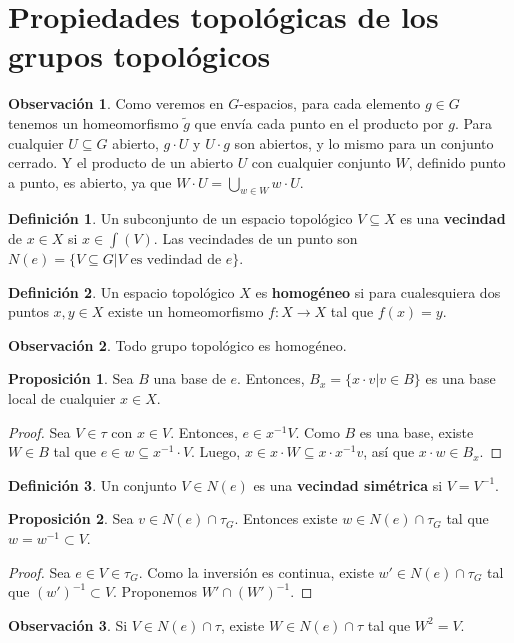 \documentclass[spanish]{article}
\theoremstyle{definition}
\newtheorem*{defn}{Definición}
\newtheorem*{obs}{Observación}
\newtheorem*{prop}{Proposición}
\begin{document}
\section{Propiedades topológicas de los grupos topológicos}
\begin{obs}
	Como veremos en $G$-espacios, para cada elemento $g\in G$ tenemos un homeomorfismo $\tilde{g}$ que envía cada punto en el producto por $g$. Para cualquier $U\subseteq G$ abierto, $g\cdot U$ y $U\cdot g$ son abiertos, y lo mismo para un conjunto cerrado. Y el producto de un abierto $U$ con cualquier conjunto $W$, definido punto a punto, es abierto, ya que $W\cdot U=\bigcup_{w\in W}w\cdot U$.
\end{obs}
\begin{defn}
	Un subconjunto de un espacio topológico $V\subseteq X$ es una \textbf{vecindad} de $x\in X$ si $x\in\int(V)$. Las vecindades de un punto son $N(e)=\{V\subseteq G|V\text{ es vedindad de }e\}$.
\end{defn}
\begin{defn}
	Un espacio topológico $X$ es \textbf{homogéneo} si para cualesquiera dos puntos $x,y\in X$ existe un homeomorfismo $f:X\to X$ tal que $f(x)=y$.
\end{defn}
\begin{obs}
	Todo grupo topológico es homogéneo.
\end{obs}
\begin{prop}
	Sea $B$ una base de $e$. Entonces, $B_x=\{x\cdot v|v\in B\}$ es una base local de cualquier $x\in X$.
\end{prop}
\begin{proof}
	Sea $V\in\tau$ con $x\in V$. Entonces, $e\in x^{-1}V$. Como $B$ es una base, existe $W\in B$ tal que $e\in w\subseteq x^{-1}\cdot V$. Luego, $x\in x\cdot W\subseteq x\cdot x^{-1}v$, así que $x\cdot w\in B_x$.
\end{proof}
\begin{defn}
	Un conjunto $V\in N(e)$ es una \textbf{vecindad simétrica} si $V=V^{-1}$.
\end{defn}
\begin{prop}
	Sea $v\in N(e)\cap\tau_G$. Entonces existe $w\in N(e)\cap\tau_G$ tal que $w=w^{-1}\subset V$.
\end{prop}
\begin{proof}
	Sea $e\in V\in\tau_G$. Como la inversión es continua, existe $w'\in N(e)\cap\tau_G$ tal que $(w')^{-1}\subset V$. Proponemos $W'\cap(W')^{-1}$.
\end{proof}
\begin{obs}
	Si $V\in N(e)\cap\tau$, existe $W\in N(e)\cap\tau$ tal que $W^2=V$.
\end{obs}
\end{document}
